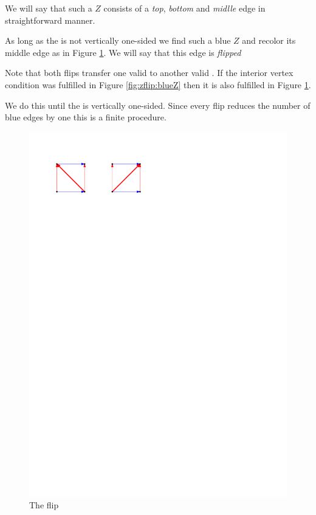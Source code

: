   We will say that such a $Z$ consists of a \emph{top}, \emph{bottom} and \emph{midlle} edge in straightforward manner. 


  As long as the \rel is not vertically one-sided we find such a blue $Z$ and recolor its middle edge as in Figure \ref{fig:zflip:flip}. We will say that this edge is \emph{flipped}

  Note that both flips transfer one valid \rel to another valid \rel. If the interior vertex condition was fulfilled in Figure \ref{fig:zflip:blueZ} then it is also fulfilled in Figure \ref{fig:zflip:flip}.

   We do this until the \rel is vertically one-sided. Since every flip reduces the number of blue edges by one this is a finite procedure.

  \begin{figure}[h]
    \centering
    \includegraphics[scale=1]{unifiedAlgo/img/zflip/flip.pdf}
    \caption{The flip}
    \label{fig:zflip:flip}
  \end{figure}

